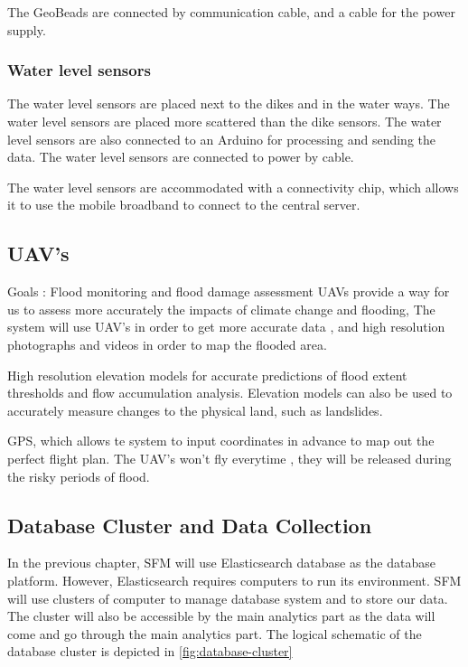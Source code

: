 The GeoBeads are connected by communication cable, and a cable for the power supply. 

\subsubsection*{Water level sensors}
The water level sensors are placed next to the dikes and in the water ways. The water level sensors are placed more scattered than the dike sensors. The water level sensors are also connected to an Arduino for processing and sending the data. The water level sensors are connected to power by cable.

The water level sensors are accommodated with a connectivity chip, which allows it to use the mobile broadband to connect to the central server.

\subsection{UAV's }
Goals : Flood monitoring and flood damage assessment
UAVs provide a way for us to assess more accurately the impacts of climate change and flooding,
The system will use UAV's in order to get more accurate data , and high resolution photographs and videos in order to map the flooded area.
 
High resolution elevation models for accurate predictions of flood extent thresholds and flow accumulation analysis. Elevation models can also be used to accurately measure changes to the physical land, such as landslides.

GPS, which allows te system to input coordinates in advance to map out the perfect flight plan.
The UAV's won't fly everytime , they will be released during the risky periods of flood.


\clearpage
\subsection{Database Cluster and Data Collection}
\label{subsec:database-data}
In the previous chapter, SFM will use Elasticsearch database as the database platform. However, Elasticsearch requires computers to run its environment. SFM will use clusters of computer to manage database system and to store our data. The cluster will also be accessible by the main analytics part as the data will come and go through the main analytics part. The logical schematic of the database cluster is depicted in \autoref{fig:database-cluster}

